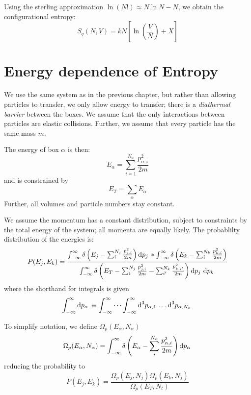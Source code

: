 Using the sterling approximation \(\ln (N!) \approx N\ln N - N\), we obtain the configurational entropy:
\begin{equation}
	S_q(N,V)=kN\left[\ln\left(\frac{V}{N}\right)+X \right]\label{eq4:confent}
\end{equation}

\chapter{Energy dependence of Entropy}
We use the same system as in the previous chapter, but rather than allowing particles to transfer, we only allow energy to transfer; there is a \emph{diathermal barrier} between the boxes. We assume that the only interactions between particles are elastic collisions. Further, we assume that every particle has the same mass \(m\).

The energy of box \(\alpha\) is then:
\begin{equation}
	E_\alpha = \sum_{i=1}^{N_\alpha} \frac{p^2_{\alpha, i}}{2m}
\end{equation}
and is constrained by
\[E_T=\sum_\alpha E_\alpha\]
Further, all volumes and particle numbers stay constant.

We assume the momentum has a constant distribution, subject to constraints by the total energy of the system; all momenta are equally likely. The probablilty distribution of the energies is:
\begin{equation}
	P(E_j, E_k)=\frac{\int_{-\infty}^{\infty}\delta \left(E_j-\sum_i^{N_j}\frac{p^2_{j,i}}{2m}\right)\d{p_j}*\int_{-\infty}^\infty\delta\left(E_k - \sum_i^{N_k}\frac{p^2_{k,i}}{2m}\right)}{\int_{-\infty}^\infty \delta\left(E_T-\sum_i^{N_j}\frac{p^2_{j,i}}{2m}-\sum_{i'}^{N_k}\frac{p^2_{k,i'}}{2m}\right)\d{p_j}\d{p_k}}
\end{equation}
where the shorthand for integrals is given
\[\int_{-\infty}^\infty\d{p_\alpha}\equiv \int_{-\infty}^\infty \cdots \int_{-\infty}^\infty \d[3]{p_{\alpha, 1}}\dots\d[3]{p_{\alpha, N_\alpha}}\]

To simplify notation, we define \(\Omega_p(E_\alpha, N_\alpha)\)
\begin{equation}
	\Omega_p(E_\alpha, N_\alpha) = \int_{-\infty}^\infty \delta \left(E_\alpha-\sum_i^{N_\alpha} \frac{p^2_{\alpha,i}}{2m}\right)\d{p_\alpha}\label{eq5:omgp}
\end{equation}
reducing the probability to
\begin{equation}
	P(E_j, E_k) = \frac{\Omega_p(E_j,N_j)\Omega_p(E_k,N_j)}{\Omega_p(E_T,N_t)}
\end{equation}

